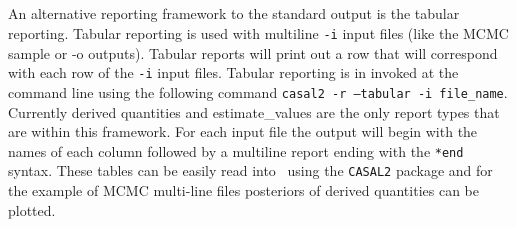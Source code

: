 \subsection{}
An alternative reporting framework to the standard output is the tabular reporting. Tabular reporting is used with multiline \texttt{-i} input files (like the MCMC sample or -o outputs). Tabular reports will print out a row that will correspond with each row of the \texttt{-i} input files. Tabular reporting is in invoked at the command line using the following command \texttt{casal2 -r --tabular -i file\_name}. Currently derived quantities and estimate\_values are the only report types that are within this framework. For each input file the output will begin with the names of each column followed by a multiline report ending with the \texttt{*end} syntax. These tables can be easily read into \R\ using the \texttt{CASAL2} package and for the example of MCMC multi-line files posteriors of derived quantities can be plotted.


